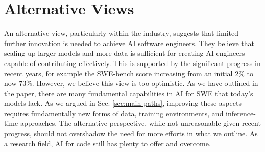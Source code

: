\vspace{-0.2cm}

\section{Alternative Views}
An alternative view, particularly within the industry, suggests that limited further innovation is needed to achieve AI software engineers. They believe that scaling up larger models and more data is sufficient for creating AI engineers capable of contributing effectively. This is supported by the significant progress in recent years, for example the SWE-bench score increasing from an initial 2\% to now 73\%. However, we believe this view is too optimistic. As we have outlined in the paper, there are many fundamental capabilities in AI for SWE that today's models lack. As we argued in Sec. \ref{sec:main-paths}, improving these aspects requires fundamentally new forms of data, training environments, and inference-time approaches. The alternative perspective, while not unreasonable given recent progress, should not overshadow the need for more efforts in what we outline. As a research field, AI for code still has plenty to offer and overcome.